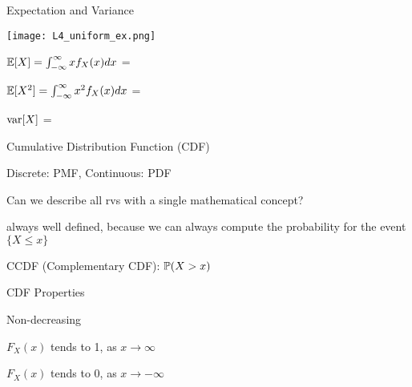 \documentclass[fleqn,aspectratio=169]{beamer}
\begin{document}
\begin{frame}{Expectation and Variance}


\texttt{[image: L4\_uniform\_ex.png]}

\bigskip

\plitemsep 0.1in
\bci 
\item $\mathbb{E}[ X ] = \int_{-\infty}^{\infty} x f_X(x) dx$ = 

\item $\mathbb{E}[ X^2 ] = \int_{-\infty}^{\infty} x^2 f_X(x) dx$ = 

\item $\text{var}[ X ]$ = 
\eci 


\end{frame}

\begin{frame}{Cumulative Distribution Function (CDF)}

{
\small
\vspace{0.1in}
\plitemsep 0.1in
\bci 
\item<1-> Discrete: PMF, Continuous: PDF
\item<2-> Can we describe all rvs with a single mathematical concept? 
\item<4-> always well defined, because we can always compute the probability for the event $\{X \le x \}$

\item<5-> CCDF (Complementary CDF): $\mathbb{P}( X > x  )$
\eci 
}
{

}
\end{frame}

\begin{frame}{CDF Properties}


\bigskip

\plitemsep 0.3in
\bci 
\item<2-> Non-decreasing

\item<3-> $F_X(x)$ tends to 1, as $x \rightarrow \infty$

\item<3-> $F_X(x)$ tends to 0, as $x \rightarrow -\infty$

\eci 
\bigskip

\end{frame}
\end{document}
